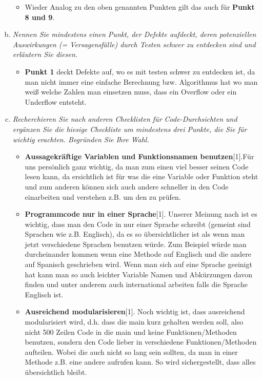 \begin{enumerate}[a)]
\begin{itemize}
        \item Wieder Analog zu den oben genannten Punkten gilt das auch für \textbf{Punkt 8 und 9}.
    \end{itemize}
    \item {\itshape Nennen Sie mindestens einen Punkt, der Defekte aufdeckt, deren potenziellen Auswirkungen (= Versagensfälle) durch Testen schwer zu entdecken sind und erläutern Sie
diesen.}
    \begin{itemize}
        \item \textbf{Punkt 1} deckt Defekte auf, wo es mit testen schwer zu entdecken ist, da man nicht immer eine einfache Berechnung bzw. Algorithmus hat wo man weiß welche Zahlen man einsetzen muss, dass ein Overflow oder ein Underflow entsteht.

    \end{itemize}
    \item {\itshape Recherchieren Sie nach anderen Checklisten für Code-Durchsichten und ergänzen Sie
die hiesige Checkliste um mindestens drei Punkte, die Sie für wichtig erachten. Begründen Sie Ihre Wahl.}
    \begin{itemize}
        \item \textbf{Aussagekräftige Variablen und Funktionsnamen benutzen}[1].Für uns persönlich ganz wichtig, da man zum einen viel besser seinen Code lesen kann, da ersichtlich ist für was die eine Variable oder Funktion steht und zum anderen können sich auch andere schneller in den Code einarbeiten und verstehen z.B. um den zu prüfen.
        \item \textbf{Programmcode nur in einer Sprache}[1]. Unserer Meinung nach ist es wichtig, dass man den Code in nur einer Sprache schreibt (gemeint sind Sprachen wie z.B. Englisch), da es so übersichtlicher ist als wenn man jetzt verschiedene Sprachen benutzen würde. Zum Beispiel würde man durcheinander kommen wenn eine Methode auf Englisch und die andere auf Spanisch geschrieben wird. Wenn man sich auf eine Sprache geeinigt hat kann man so auch leichter Variable Namen und Abkürzungen davon finden und unter anderem auch international arbeiten falls die Sprache Englisch ist.
        \item \textbf{Ausreichend modularisieren}[1]. Noch wichtig ist, dass ausreichend modularisiert wird, d.h. dass die main kurz gehalten werden soll, also nicht 500 Zeilen Code in die main und keine Funktionen/Methoden benutzen, sondern den Code lieber in verschiedene Funktionen/Methoden aufteilen. Wobei die auch nicht so lang sein sollten, da man in einer Methode z.B. eine andere aufrufen kann. So wird sichergestellt, dass alles übersichtlich bleibt.

\end{itemize}
\end{enumerate}

